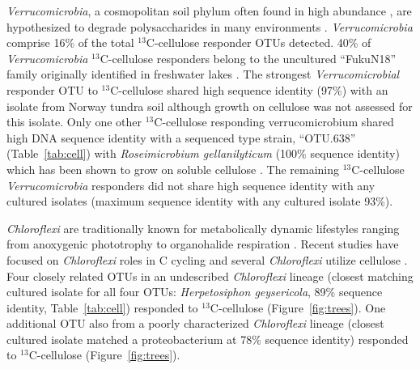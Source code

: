 \textit{Verrucomicrobia}, a cosmopolitan soil phylum often found in high
abundance \citep{Fierer_2013}, are hypothesized to degrade polysaccharides in
many environments \citep{Fierer_2013,Herlemann_2013,10543821}.
\textit{Verrucomicrobia} comprise 16\% of the total $^{13}$C-cellulose
responder OTUs detected. 40\% of \textit{Verrucomicrobia} $^{13}$C-cellulose
responders belong to the uncultured ``FukuN18'' family originally identified in
freshwater lakes \citep{Parveen_2013}.  The strongest \textit{Verrucomicrobial} responder OTU to $^{13}$C-cellulose shared high sequence identity (97\%) with an isolate from Norway tundra soil
\citep{Jiang_2011} although growth on cellulose was not assessed for this
isolate. Only one other $^{13}$C-cellulose responding verrucomicrobium shared
high DNA sequence identity with a sequenced type strain, ``OTU.638''
(Table~\ref{tab:cell}) with \textit{Roseimicrobium gellanilyticum} (100\%
sequence identity) which has been shown to grow on soluble
cellulose \citep{Otsuka_2012}. The remaining $^{13}$C-cellulose
\textit{Verrucomicrobia} responders did not share high sequence identity with
any cultured isolates (maximum sequence identity with any cultured isolate
93\%).

\textit{Chloroflexi} are traditionally known for metabolically dynamic
lifestyles ranging from anoxygenic phototrophy to organohalide respiration
\citep{Hug_2013}. Recent studies have focused on \textit{Chloroflexi} roles in
C cycling \citep{Hug_2013, Goldfarb_2011,Cole_2013} and several
\textit{Chloroflexi} utilize cellulose \citep{Goldfarb_2011, Cole_2013,
Hug_2013}. Four closely related OTUs in an undescribed \textit{Chloroflexi}
lineage (closest matching cultured isolate for all four OTUs:
\textit{Herpetosiphon geysericola}, 89\% sequence identity,
Table~\ref{tab:cell}) responded to $^{13}$C-cellulose (Figure~\ref{fig:trees}).
One additional OTU also from a poorly characterized \textit{Chloroflexi}
lineage (closest cultured isolate matched a proteobacterium at 78\% sequence
identity) responded to $^{13}$C-cellulose (Figure~\ref{fig:trees}).

